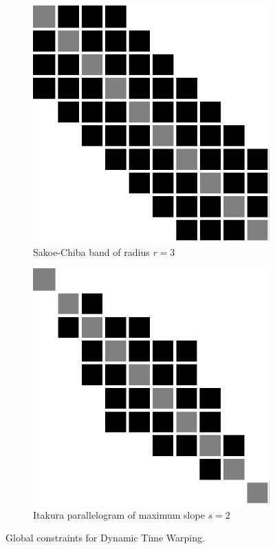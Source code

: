\begin{figure}[t]
    \begin{subfigure}[b]{0.4\textwidth}
         \centering
         \includegraphics[width=\textwidth]{fig/sakoe}
         \caption{Sakoe-Chiba band of radius $r=3$}
         \label{fig:sakoe}
     \end{subfigure}
     \hfill
     \begin{subfigure}[b]{0.4\textwidth}
          \centering
          \includegraphics[width=\textwidth]{fig/itakura}
          \caption{Itakura parallelogram of maximum slope $s=2$}
          \label{fig:itakura}
      \end{subfigure}
    \caption{Global constraints for Dynamic Time Warping.}
\end{figure}




